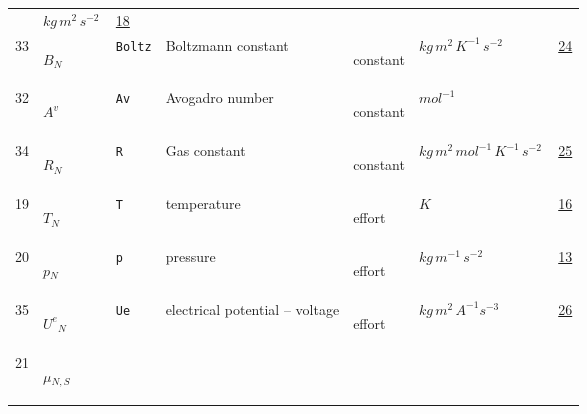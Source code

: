 \begin{longtable}{|p{1cm}|p{2.5cm}|p{4.5cm}|p{8cm}|p{3.0cm}|p{3cm}|p{1cm}|}
             & $ kg \,m^{2} \,s^{-2} \, $
             &                 \hyperlink{"e:18"}{ 18 }
                 \\
            33
             & \hypertarget{"v:33"}{ $ {B}{_{N}} $}
             & \verb|Boltz|
             & Boltzmann constant
             & \begin{lay}constant \end{lay}
             & $ kg \,m^{2} \,K^{-1} \,s^{-2} \, $
             &                 \hyperlink{"e:24"}{ 24 }
                 \\
            32
             & \hypertarget{"v:32"}{ $ {{A^v}}{_{}} $}
             & \verb|Av|
             & Avogadro number
             & \begin{lay}constant \end{lay}
             & $ mol^{-1} \, $
             & \\
            34
             & \hypertarget{"v:34"}{ $ {R}{_{N}} $}
             & \verb|R|
             & Gas constant
             & \begin{lay}constant \end{lay}
             & $ kg \,m^{2} \,mol^{-1} \,K^{-1} \,s^{-2} \, $
             &                 \hyperlink{"e:25"}{ 25 }
                 \\
            19
             & \hypertarget{"v:19"}{ $ {T}{_{N}} $}
             & \verb|T|
             & temperature
             & \begin{lay}effort \end{lay}
             & $ K \, $
             &                 \hyperlink{"e:16"}{ 16 }
                 \\
            20
             & \hypertarget{"v:20"}{ $ {p}{_{N}} $}
             & \verb|p|
             & pressure
             & \begin{lay}effort \end{lay}
             & $ kg \,m^{-1} \,s^{-2} \, $
             &                 \hyperlink{"e:13"}{ 13 }
                 \\
            35
             & \hypertarget{"v:35"}{ $ {{U^e}}{_{N}} $}
             & \verb|Ue|
             & electrical potential -- voltage
             & \begin{lay}effort \end{lay}
             & $ kg \,m^{2} \,A^{-1} s^{-3} \, $
             &                 \hyperlink{"e:26"}{ 26 }
                 \\
            21
             & \hypertarget{"v:21"}{ $ {{\mu}}{_{N, S}} $}

\end{longtable}
